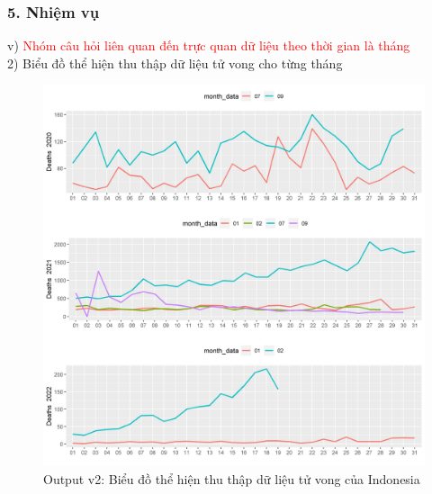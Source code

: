 \documentclass[english,10pt,table]{beamer}
\begin{document}
\begin{frame}[fragile]
\frametitle{5.  Nhiệm vụ}
v) \textcolor{red}{Nhóm câu hỏi liên quan đến trực quan dữ liệu theo thời gian là tháng}\\
    2) Biểu đồ thể hiện thu thập dữ liệu tử vong cho từng tháng
	\begin{figure}[h!]
	\begin{center}
		    \includegraphics[scale = 0.28]{Images/V/v2 Indonesia .jpeg}
		     \caption{Output v2: Biểu đồ thể hiện thu thập dữ liệu tử vong của Indonesia}
		\end{center}
		\end{figure}
\end{frame}
\end{document}
